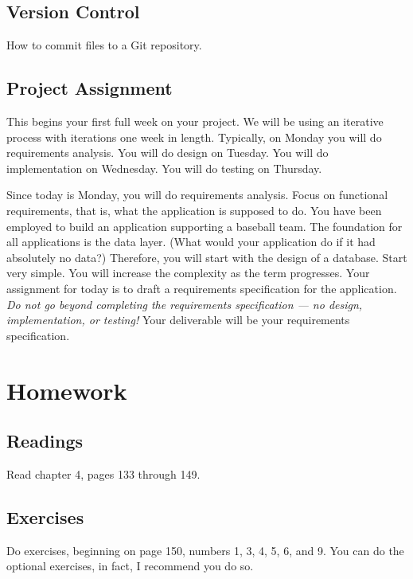 \documentclass{article}
\begin{document}
        \subsection{Version Control}

        How to commit files to a Git repository.

        \subsection{Project Assignment}

        This begins your first full week on your project. We will be using an iterative process with iterations one week in length. Typically, on Monday you will do requirements analysis. You will do design on Tuesday. You will do implementation on Wednesday. You will do testing on Thursday.

        Since today is Monday, you will do requirements analysis. Focus on functional requirements, that is, what the application is supposed to do. You have been employed to build an application supporting a baseball team. The foundation for all applications is the data layer. (What would your application do if it had absolutely no data?) Therefore, you will start with the design of a database. Start very simple. You will increase the complexity as the term progresses. Your assignment for today is to draft a requirements specification for the application. \textit{Do not go beyond completing the requirements specification --- no design, implementation, or testing!} Your deliverable will be your requirements specification.

    \section{Homework}


        \subsection{Readings}

        Read chapter 4, pages 133 through 149.
        
        \subsection{Exercises}

        Do exercises, beginning on page 150, numbers 1, 3, 4, 5, 6, and 9. You can do the optional exercises, in fact, I recommend you do so.
\end{document}
